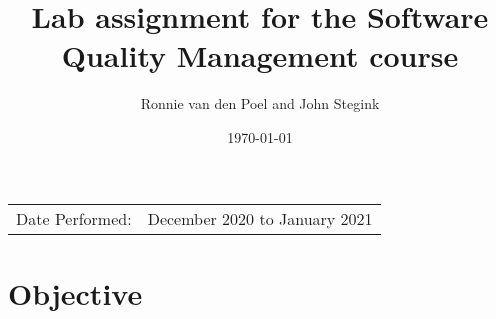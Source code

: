 \documentclass{article}
\title{Lab assignment for the Software Quality Management course} %
\author{Ronnie van den Poel and John Stegink} %
\date{\today} %
\begin{document}
\maketitle %

\begin{center}
\begin{tabular}{l r}
Date Performed: & December 2020 to January 2021 \\ %
\end{tabular}
\end{center}



\section{Objective}
\end{document}
